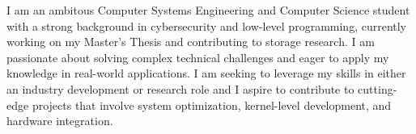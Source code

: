 I am an ambitous Computer Systems Engineering and Computer Science student with a strong background in cybersecurity and low-level programming, currently working on my Master's Thesis and contributing to storage research. I am passionate about solving complex technical challenges and eager to apply my knowledge in real-world applications. I am seeking to leverage my skills in either an industry development or research role and I aspire to contribute to cutting-edge projects that involve system optimization, kernel-level development, and hardware integration.
